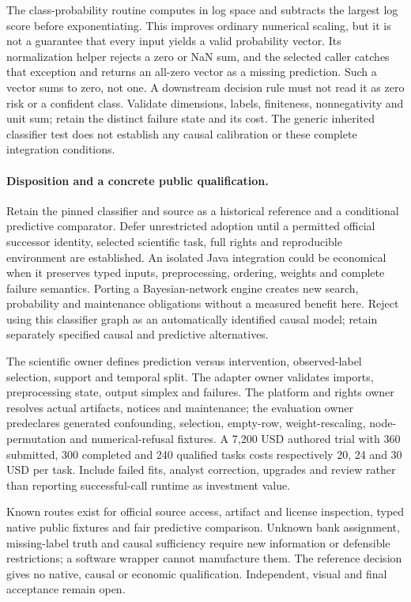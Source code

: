 The class-probability routine computes in log space and subtracts the largest
log score before exponentiating. This improves ordinary numerical scaling,
but it is not a guarantee that every input yields a valid probability vector.
Its normalization helper rejects a zero or NaN sum, and the selected caller
catches that exception and returns an all-zero vector as a missing prediction.
Such a vector sums to zero, not one. A downstream decision rule must not read
it as zero risk or a confident class. Validate dimensions, labels, finiteness,
nonnegativity and unit sum; retain the distinct failure state and its cost.
The generic inherited classifier test does not establish any causal calibration
or these complete integration conditions.\citep{exec24_weka_source,exec24_weka_choice}

\paragraph{Disposition and a concrete public qualification.}
Retain the pinned classifier and source as a historical reference and a
conditional predictive comparator. Defer unrestricted adoption until a
permitted official successor identity, selected scientific task, full rights
and reproducible environment are established. An isolated Java integration
could be economical when it preserves typed inputs, preprocessing, ordering,
weights and complete failure semantics. Porting a Bayesian-network engine
creates new search, probability and maintenance obligations without a measured
benefit here. Reject using this classifier graph as an automatically identified
causal model; retain separately specified causal and predictive alternatives.
\citep{exec24_weka_choice}

The scientific owner defines prediction versus intervention, observed-label
selection, support and temporal split. The adapter owner validates imports,
preprocessing state, output simplex and failures. The platform and rights owner
resolves actual artifacts, notices and maintenance; the evaluation owner
predeclares generated confounding, selection, empty-row, weight-rescaling,
node-permutation and numerical-refusal fixtures. A 7,200 USD authored trial
with 360 submitted, 300 completed and 240 qualified tasks costs respectively
20, 24 and 30 USD per task. Include failed fits, analyst correction, upgrades
and review rather than reporting successful-call runtime as investment value.
\citep{exec24_weka_choice}

Known routes exist for official source access, artifact and license inspection,
typed native public fixtures and fair predictive comparison. Unknown bank
assignment, missing-label truth and causal sufficiency require new information
or defensible restrictions; a software wrapper cannot manufacture them. The
reference decision gives no native, causal or economic qualification.
Independent, visual and final acceptance remain open.
